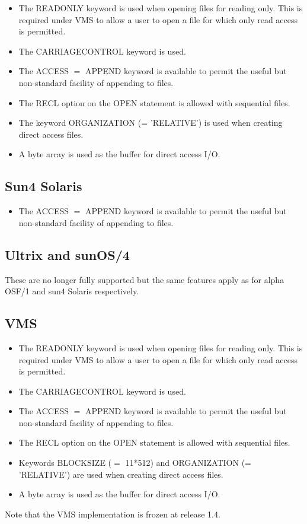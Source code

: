 \documentclass[twoside,11pt]{article}
\renewcommand{\_}{\texttt{\symbol{95}}}
\begin{document}
\begin{itemize}
\item The READONLY keyword is used when opening files for reading only.
This is required under VMS to allow a user to open a file for which
only read access is permitted.
\item The CARRIAGECONTROL keyword is used.
\item The ACCESS $=$ APPEND keyword is available to permit the useful but
non-standard facility of appending to files.
\item The RECL option on the OPEN statement is allowed with sequential files.
\item The keyword ORGANIZATION (= 'RELATIVE') is used when creating direct
access files.
\item A byte array is used as the buffer for direct access I/O.
\end{itemize}

\subsection{Sun4 Solaris}

\begin{itemize}
\item The ACCESS $=$ APPEND keyword is available to permit the useful but
non-standard facility of appending to files.
\end{itemize}

\subsection{Ultrix and sunOS/4}
These are no longer fully supported but the same features apply as for alpha
OSF/1 and sun4 Solaris respectively.

\subsection{VMS}
\begin{itemize}
\item The READONLY keyword is used when opening files for reading only.
This is required under VMS to allow a user to open a file for which
only read access is permitted.
\item The CARRIAGECONTROL keyword is used.
\item The ACCESS $=$ APPEND keyword is available to permit the useful but
non-standard facility of appending to files.
\item The RECL option on the OPEN statement is allowed with sequential files.
\item Keywords BLOCKSIZE ($=$ 11*512) and ORGANIZATION (= 'RELATIVE') are used 
when creating direct access files.
\item A byte array is used as the buffer for direct access I/O.
\end{itemize}
Note that the VMS implementation is frozen at release 1.4.
\end{document}

